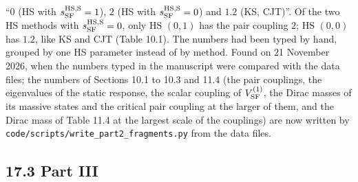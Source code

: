 \documentclass[
  10pt,
]{article}
\begin{document}
\begin{enumerate}
  ``\(0\) (HS with \(s^{\rm HS,S}_{\rm SF}=1\)), \(2\) (HS with
  \(s^{\rm HS,S}_{\rm SF}=0\)) and \(1.2\) (KS, CJT)''. Of the two HS
  methods with \(s^{\rm HS,S}_{\rm SF}=0\), only HS \((0,1)\) has the
  pair coupling \(2\); HS \((0,0)\) has \(1.2\), like KS and CJT (Table
  10.1). The numbers had been typed by hand, grouped by one HS parameter
  instead of by method. Found on 21 November 2026, when the numbers
  typed in the manuscript were compared with the data files; the numbers
  of Sections 10.1 to 10.3 and 11.4 (the pair couplings, the eigenvalues
  of the static response, the scalar coupling of \(V^{(1)}_{\rm SF}\),
  the Dirac masses of its massive states and the critical pair coupling
  at the larger of them, and the Dirac mass of Table 11.4 at the largest
  scale of the couplings) are now written by
  \texttt{code/scripts/write\_part2\_fragments.py} from the data files.
\end{enumerate}

\hypertarget{part-iii}{%
\subsection{17.3 Part III}\label{part-iii}}
\end{document}
